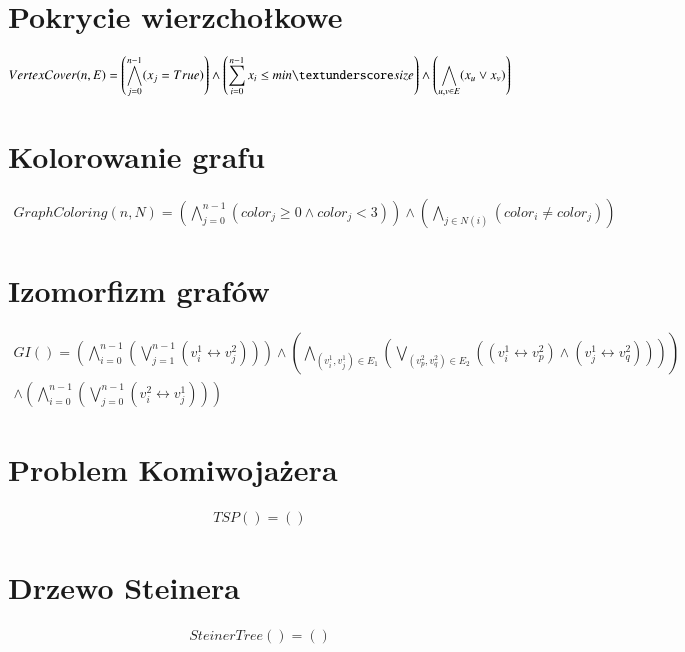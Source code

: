 \section{Pokrycie wierzchołkowe}

\begin{align*}
	VertexCover(n, E) = \left( \bigwedge_{j=0}^{n-1} (x_j = True) \right) \land 
	\left( \sum_{i=0}^{n-1} x_i\leq min\textunderscore size \right) \land 
	\left( \bigwedge_{u, v \in E} (x_u \lor x_v) \right)
\end{align*}

\section{Kolorowanie grafu}

\begin{align*}
	GraphColoring(n, N) = \left( \bigwedge_{j=0}^{n-1} (color_j \geq 0 \land color_j < 3) \right) \land 
	\left( \bigwedge_{j \in N(i)} (color_i \neq color_j) \right)
\end{align*}

\section{Izomorfizm grafów}

\begin{align*}
	GI() = \left( \bigwedge_{i=0}^{n-1} \left( \bigvee_{j=1}^{n-1} (v_i^1 \leftrightarrow v_j^2) \right) \right) 
	\land \left( \bigwedge_{(v_i^1, v_j^1) \in E_1} \left( \bigvee_{(v_p^2, v_q^2) \in E_2} ((v_i^1 \leftrightarrow v_p^2) \land (v_j^1 \leftrightarrow v_q^2)) \right) \right) \\
	\land \left( \bigwedge_{i=0}^{n-1} \left( \bigvee_{j=0}^{n-1} (v_i^2 \leftrightarrow v_j^1) \right) \right)	
\end{align*}

\section{Problem Komiwojażera}

\begin{align*}
	TSP() = \left(  \right) 
\end{align*}

\section{Drzewo Steinera}

\begin{align*}
	SteinerTree() = \left(  \right) 
\end{align*}

